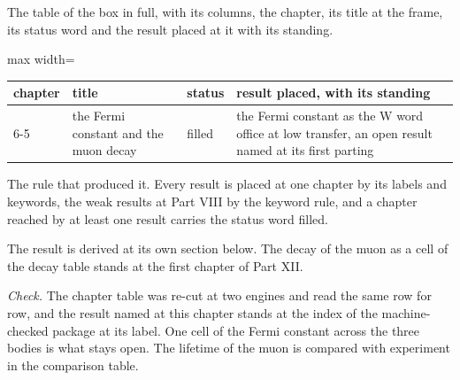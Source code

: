 \begin{chproof}[instrument]
The table of the box in full, with its columns, the chapter, its title at the frame, its status word and the result placed at it with its standing.
\begin{center}\small
\begin{adjustbox}{max width=\linewidth}\begin{tabular}{llll}
\hline
chapter & title & status & result placed, with its standing \\
\hline
6-5 & the Fermi constant and the muon decay & filled & the Fermi constant as the W word office at low transfer, an open result named at its first parting \\
\hline
\end{tabular}\end{adjustbox}
\end{center}
The rule that produced it. Every result is placed at one chapter by its labels and keywords, the weak results at Part VIII by the keyword rule, and a chapter reached by at least one result carries the status word filled.

The result is derived at its own section below. The decay of the muon as a cell of the decay table stands at the first chapter of Part XII.

\emph{Check.} The chapter table was re-cut at two engines and read the same row for row, and the result named at this chapter stands at the index of the machine-checked package at its label.
One cell of the Fermi constant across the three bodies is what stays open. The lifetime of the muon is compared with experiment in the comparison table.
\end{chproof}
\label{chend:VI-5-fermi-constant-and-the-muon-decay}

